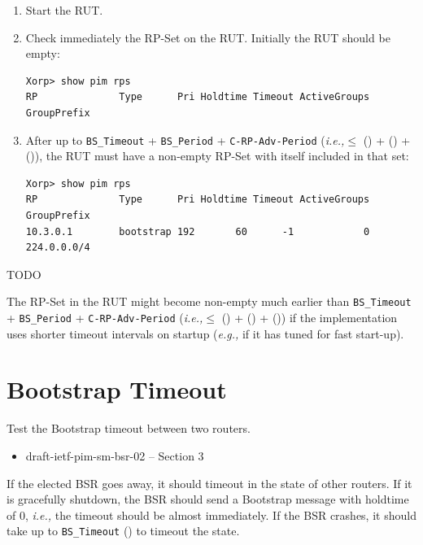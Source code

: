 \documentclass[11pt]{report}
\newcommand{\ie}{\emph{i.e.,}\xspace}
\newcommand{\eg}{\emph{e.g.,}\xspace}
\begin{document}
\begin{enumerate}

  \item Start the RUT.

  \item Check immediately the RP-Set on the RUT. Initially the RUT should be
  empty:

\begin{verbatim}
Xorp> show pim rps
RP              Type      Pri Holdtime Timeout ActiveGroups GroupPrefix
\end{verbatim}

  \item After up to \verb=BS_Timeout= + \verb=BS_Period= +
        \verb=C-RP-Adv-Period=
        (\ie $\leq$ ({\PimsmBSTimeout}) + ({\PimsmBSTimeout}) +
        ({\PimsmCRPAdvPeriod})), the RUT must have a non-empty RP-Set with
        itself included in that set:

\begin{verbatim}
Xorp> show pim rps
RP              Type      Pri Holdtime Timeout ActiveGroups GroupPrefix
10.3.0.1        bootstrap 192       60      -1            0 224.0.0.0/4
\end{verbatim}

\end{enumerate}


TODO

The RP-Set in the RUT might become non-empty much earlier than
\verb=BS_Timeout= + \verb=BS_Period= + \verb=C-RP-Adv-Period= (\ie $\leq$
({\PimsmBSTimeout}) + ({\PimsmBSTimeout}) + ({\PimsmCRPAdvPeriod}))
if the implementation uses shorter timeout intervals on startup (\eg
if it has tuned for fast start-up).

\newpage
\section{Bootstrap Timeout}

Test the Bootstrap timeout between two routers.

\begin{itemize}
  \item draft-ietf-pim-sm-bsr-02 -- Section 3
\end{itemize}

If the elected BSR goes away, it should timeout in the
state of other routers. If it is gracefully shutdown, the BSR should send a
Bootstrap message with holdtime of 0, \ie the timeout should be almost
immediately.
If the BSR crashes, it should take up to \verb=BS_Timeout= ({\PimsmBSTimeout})
to timeout the state.
\end{document}
